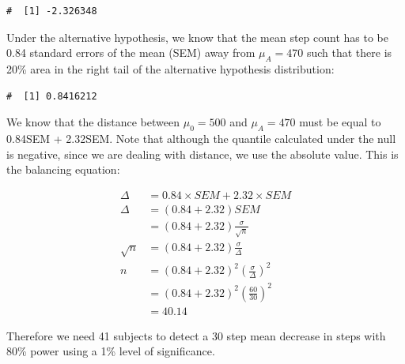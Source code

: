 \documentclass[letterpaper,11pt,twoside,]{pinp}
\begin{document}
\begin{ShadedResult}
\begin{verbatim}
#  [1] -2.326348
\end{verbatim}
\end{ShadedResult}

Under the alternative hypothesis, we know that the mean step count has
to be 0.84 standard errors of the mean (SEM) away from \(\mu_A=470\)
such that there is 20\% area in the right tail of the alternative
hypothesis distribution:

\begin{Shaded}
\begin{Highlighting}[]
\NormalTok{(} \NormalTok{, } \NormalTok{)}
\end{Highlighting}
\end{Shaded}

\begin{ShadedResult}
\begin{verbatim}
#  [1] 0.8416212
\end{verbatim}
\end{ShadedResult}

We know that the distance between \(\mu_0=500\) and \(\mu_A=470\) must
be equal to 0.84SEM + 2.32SEM. Note that although the quantile
calculated under the null is negative, since we are dealing with
distance, we use the absolute value. This is the balancing equation:

\begin{align*}
\Delta &= 0.84\times SEM + 2.32\times SEM \\
\Delta &= (0.84 + 2.32) SEM \\
 &= (0.84 + 2.32) \frac{\sigma}{\sqrt{n}} \\
\sqrt{n} & = (0.84 + 2.32) \frac{\sigma}{\Delta}\\
n & = (0.84 + 2.32)^2 \left(\frac{\sigma}{\Delta}\right)^2 \\
 & = (0.84 + 2.32)^2 \left(\frac{60}{30}\right)^2 \\
 & = 40.14
\end{align*}

Therefore we need 41 subjects to detect a 30 step mean decrease in steps
with 80\% power using a 1\% level of significance.
\end{document}
